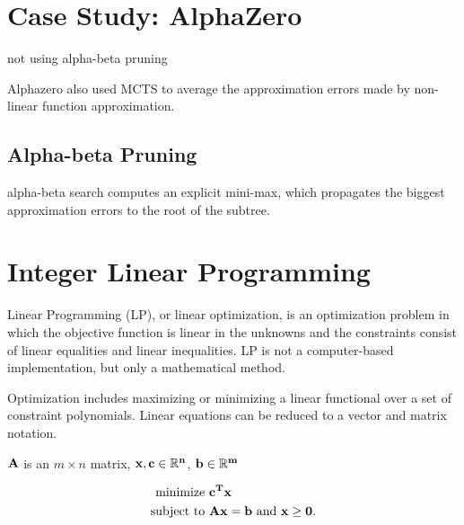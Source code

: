 \documentclass[11pt]{article}
\newtheorem{theorem}{Theorem}
\begin{document}
	
	
	\section{Case Study: AlphaZero}\label{section-alphazero}
		
	not using alpha-beta pruning 
	
	Alphazero also used MCTS to average the approximation errors made by non-linear function approximation.
	
	\subsection{Alpha-beta Pruning}
	
	
	
	alpha-beta search computes an explicit mini-max, which propagates the biggest approximation errors to the root of the subtree.
	
	
	
	
	\section{Integer Linear Programming}\label{section-ILP}
	
	Linear Programming (LP), or linear optimization, is an optimization problem in which the objective function is linear in the unknowns and the constraints consist of linear equalities and linear inequalities. LP is not a computer-based implementation, but only a mathematical method.
	
	Optimization includes maximizing or minimizing a linear functional over a set of constraint polynomials. Linear equations can be reduced to a vector and matrix notation.


	$\bf{A}$ is an $m \times n$ matrix, $\bf{x}, \bf{c} \in \mathbb{R}^{n}$, $\bf{b} \in \mathbb{R}^{m}$ 

\begin{equation}
\begin{aligned}
	\text{minimize } &\bf{c}^{T}\bf{x}\\
	\text{subject to } &\bf{Ax} = \bf{b} \text{ and } \bf{x} \geq 0.
\end{aligned}
\end{equation}
	
\end{document}

